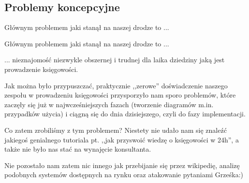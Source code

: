 \documentclass{beamer}
\begin{document}
\subsection{Problemy koncepcyjne}
  \begin{frame}
    \begin{block}{}
      Głównym problemem jaki stanął na naszej drodze to ...
    \end{block}
  \end{frame}
  \begin{frame}
    \begin{block}{}
      Głównym problemem jaki stanął na naszej drodze to ...
    \end{block}
    \begin{block}{}
      ... nieznajomość niezwykle obszernej i trudnej dla laika dziedziny jaką jest prowadzenie księgowości.
    \end{block}
  \end{frame}
  \begin{frame}
    \begin{block}{}
      Jak można było przypuszczać, praktycznie ,,zerowe'' doświadczenie naszego zespołu w prowadzeniu księgowości przysporzyło nam sporo problemów, które zaczęły się już w najwcześniejszych fazach (tworzenie diagramów m.in. przypadków użycia) i ciągną się do dnia dzisiejszego, czyli do fazy implementacji.
    \end{block}
  \end{frame}
  \begin{frame}
    \begin{block}{}
      Co zatem zrobiliśmy z tym problemem? Niestety nie udało nam się znaleźć jakiegoś genialnego tutoriala pt. ,,jak przyswoić wiedzę o księgowości w 24h'', a także nie było nas stać na wynajęcie konsultanta.
    \end{block}
  \end{frame}
  \begin{frame}
    \begin{block}{}
      Nie pozostało nam zatem nic innego jak przebijanie się przez wikipedię, analizę podobnych systemów dostępnych na rynku oraz atakowanie pytaniami Grześka:)
    \end{block}
  \end{frame}
\end{document}

